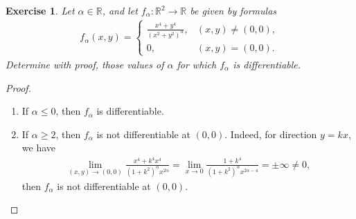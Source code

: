 \documentclass[11pt]{article}
\newtheorem{exercise}{Exercise}[section]
\theoremstyle{definition}
\numberwithin{equation}{subsection}
\begin{document}
\begin{exercise}{\rm *}
Let $\alpha \in \mathbb{R}$, and let $f_\alpha: \mathbb{R}^2 \to \mathbb{R}$ be given by formulas
\begin{align*}
    f_{\alpha}(x,y) = \begin{cases}
        \displaystyle \frac{x^4 + y^4}{(x^2 + y^2)^{\alpha}}, & (x,y) \neq (0,0), \\
        0, & (x, y) = (0,0).
    \end{cases}
\end{align*}
Determine with proof, those values of $\alpha$ for which $f_{\alpha}$ is differentiable.
\end{exercise}
\begin{proof}
~\begin{enumerate}[label=(\alph*)]
    \item If $\alpha \leq 0$, then $f_\alpha$ is differentiable.
    
    \item If $\alpha \geq 2$, then $f_\alpha$ is not differentiable at $(0,0)$. Indeed, for direction $y = kx$, we have
    \begin{align*}
        \lim_{(x,y) \to (0,0)} \frac{x^4 + k^4x^4}{(1 + k^2)^{\alpha} x^{2\alpha}} = \lim_{x \to 0} \frac{1 + k^4}{(1 + k^2)^{\alpha} x^{2\alpha - 4}} = \pm \infty \neq 0,
    \end{align*}
    then $f_\alpha$ is not differentiable at $(0,0)$.
    

\end{enumerate}
\end{proof}
\end{document}
